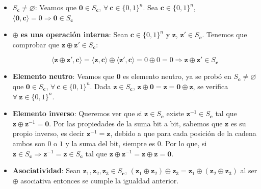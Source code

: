  \begin{itemize}
     \item $S_{\mathbf{c}} \neq \varnothing$: Veamos que $\mathbf{0} \in S_{\mathbf{c}}$, $\forall\: \mathbf{c} \in \{0,1\}^{n}$. Sea $\mathbf{c} \in \{0,1\}^{n}$, $\langle\mathbf{0},\mathbf{c}\rangle=0 \Rightarrow \mathbf{0} \in S_{\mathbf{c}}$

     \item $\oplus$ \textbf{es una operación interna}: Sean $\mathbf{c} \in \{0,1\}^{n}$ y $\mathbf{z}$, $\mathbf{z}' \in S_{\mathbf{c}}$. Tenemos que comprobar que $\mathbf{z} \oplus\mathbf{z}' \in S_{\mathbf{c}}$:

     \begin{equation}
         \langle\mathbf{z} \oplus \mathbf{z}', \mathbf{c} \rangle = \langle\mathbf{z}, \mathbf{c} \rangle \oplus \langle \mathbf{z}', \mathbf{c} \rangle = 0\oplus0=0 \Rightarrow \mathbf{z} \oplus\mathbf{z}' \in S_{\mathbf{c}}
     \end{equation}
    
     \item \textbf{Elemento neutro}: Veamos que $\mathbf{0}$ es elemento neutro, ya se probó en $S_{\mathbf{c}} \neq \varnothing$ que $\mathbf{0} \in S_{\mathbf{c}}$, $ \forall \:\mathbf{c} \in \{0,1\}^{n}$. Dada $\mathbf{z} \in S_{\mathbf{c}}$, $\mathbf{z} \oplus \mathbf{0} = \mathbf{z} = \mathbf{0} \oplus \mathbf{z}$, se verifica $\forall \:\mathbf{z} \in \{0,1\}^{n}$.

     \item \textbf{Elemento inverso}: Queremos ver que si $\mathbf{z} \in S_{\mathbf{c}}$ existe $\mathbf{z}^{-1} \in S_{\mathbf{c}}$ tal que $\mathbf{z}\oplus\mathbf{z}^{-1}=\mathbf{0}$. Por las propiedades de la suma bit a bit, sabemos que $\mathbf{z}$ es su propio inverso, es decir $\mathbf{z}^{-1}=\mathbf{z}$, debido a que para cada posición de la cadena ambos son $0$ o $1$ y la suma del bit, siempre es $0$. Por lo que, si $\mathbf{z} \in S_{\mathbf{c}} \Rightarrow \mathbf{z}^{-1} = \mathbf{z} \in S_{\mathbf{c}}$ tal que $\mathbf{z}\oplus\mathbf{z}^{-1}=\mathbf{z}\oplus\mathbf{z}=\mathbf{0}$.

     \item \textbf{Asociatividad}: Sean $\mathbf{z}_{1}, \mathbf{z}_{2}, \mathbf{z}_{3} \in S_{\mathbf{c}}$, $(\mathbf{z}_{1}\oplus \mathbf{z}_{2}) \oplus \mathbf{z}_{3} = \mathbf{z}_{1} \oplus( \mathbf{z}_{2} \oplus \mathbf{z}_{3})$ al ser $\oplus$ asociativa entonces se cumple la igualdad anterior.
 \end{itemize}

